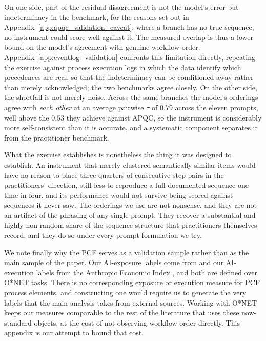 On one side, part of the residual disagreement is not the model's error but indeterminacy in the benchmark, for the reasons set out in Appendix~\ref{app:apqc_validation_caveat}: where a branch has no true sequence, no instrument could score well against it.
The measured overlap is thus a lower bound on the model's agreement with genuine workflow order.
Appendix~\ref{app:eventlog_validation} confronts this limitation directly, repeating the exercise against process execution logs in which the data identify which precedences are real, so that the indeterminacy can be conditioned away rather than merely acknowledged; the two benchmarks agree closely.
On the other side, the shortfall is not merely noise.
Across the same branches the model's orderings agree with \emph{each other} at an average pairwise $\tau$ of $0.79$ across the eleven prompts, well above the $0.53$ they achieve against APQC, so the instrument is considerably more self-consistent than it is accurate, and a systematic component separates it from the practitioner benchmark.

What the exercise establishes is nonetheless the thing it was designed to establish.
An instrument that merely clustered semantically similar items would have no reason to place three quarters of consecutive step pairs in the practitioners' direction, still less to reproduce a full documented sequence one time in four, and its performance would not survive being scored against sequences it never saw.
The orderings we use are not nonsense, and they are not an artifact of the phrasing of any single prompt.
They recover a substantial and highly non-random share of the sequence structure that practitioners themselves record, and they do so under every prompt formulation we try.

We note finally why the PCF serves as a validation sample rather than as the main sample of the paper.
Our AI-exposure labels come from \citet{eloundou2023gpts} and our AI-execution labels from the Anthropic Economic Index \citep{handa2025economictasksperformedai}, and both are defined over O*NET tasks.
There is no corresponding exposure or execution measure for PCF process elements, and constructing one would require us to generate the very labels that the main analysis takes from external sources.
Working with O*NET keeps our measures comparable to the rest of the literature that uses these now-standard objects, at the cost of not observing workflow order directly.
This appendix is our attempt to bound that cost.
